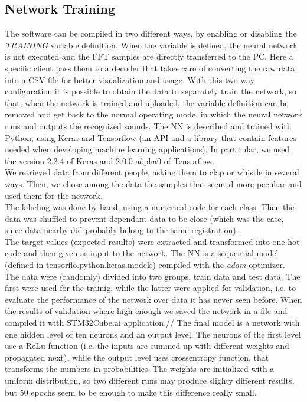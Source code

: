 \documentclass[12pt]{article}
\begin{document}
\subsection{Network Training}
The software can be compiled in two different ways, by enabling or disabling the \textit{TRAINING} variable definition. When the variable is defined, the neural network is not executed and the FFT samples are directly transferred to the PC. Here a specific client pass them to a decoder that takes care of converting the raw data into a CSV file for better visualization and usage. With this two-way configuration it is possible to obtain the data to separately train the network, so that, when the network is trained and uploaded, the variable definition can be removed and get back to the normal operating mode, in which the neural network runs and outputs the recognized sounds.
The NN is described and trained with Python, using Keras and Tensorflow (an API and a library that contain features needed when developing machine learning applications). In particular, we used the version 2.2.4 of Keras and 2.0.0-aòpha0 of Tensorflow.\\
We retrieved data from different people, asking them to clap or whistle in several ways. Then, we chose among the data the samples that seemed more peculiar and used them for the network.\\
The labeling was done by hand, using a numerical code for each class. Then the data was shuffled to prevent dependant data to be close (which was the case, since data nearby did probably belong to the same registration).\\
The target values (expected results) were extracted and transformed into one-hot code and then given as input to the network. The NN is a sequential model (defined in tensorflo.python.keras.models) compiled with the \textit{adam} optimizer.\\
The data were (randomly) divided into two groups, train data and test data. The first were used for the trainig, while the latter were applied for validation, i.e. to evaluate the performance of the network over data it has never seen before. When the results of validation where high enough we saved the network in a file and compiled it with STM32Cube.ai application.//
The final model is a network with one hidden level of ten neurons and an output level. The neurons of the first level use a ReLu function (i.e. the inputs are summed up with different weights and propagated next), while the output level uses crossentropy function, that transforms the numbers in probabilities. The weights are initialized with a uniform distribution, so two different runs may produce slighty different results, but 50 epochs seem to be enough to make this difference really small.
\end{document}
